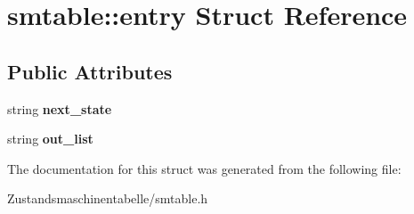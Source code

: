 \hypertarget{structsmtable_1_1entry}{}\section{smtable\+:\+:entry Struct Reference}
\label{structsmtable_1_1entry}
\subsection*{Public Attributes}
\begin{DoxyCompactItemize}
\item 
\mbox{\label{structsmtable_1_1entry_a969a0ef26bd2db818d8302830fa859c4}} 
string {\bfseries next\+\_\+state}
\item 
\mbox{\label{structsmtable_1_1entry_a749f2f04a0dd75e855891558395ed226}} 
string {\bfseries out\+\_\+list}
\end{DoxyCompactItemize}


The documentation for this struct was generated from the following file\+:\begin{DoxyCompactItemize}
\item 
Zustandsmaschinentabelle/smtable.\+h\end{DoxyCompactItemize}

